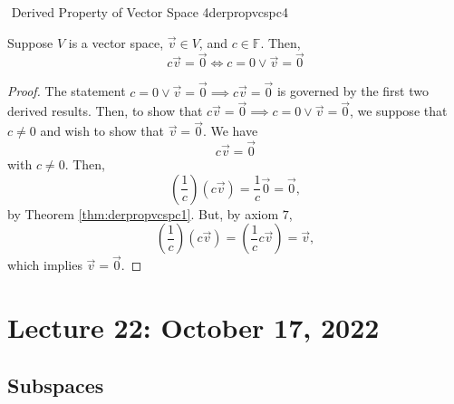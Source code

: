         \begin{theorem}{\Stop\,\,Derived Property of Vector Space 4}{derpropvcspc4}

            Suppose \(V\) is a vector space, \(\vec{v}\in V\), and \(c\in\mathbb{F}\). Then,
            \begin{equation*}
                c\vec{v}=\vec{0}\iff c=0\vee \vec{v}=\vec{0}
            \end{equation*}
            \begin{proof}
                The statement \(c=0\vee\vec{v}=\vec{0}\implies c\vec{v}=\vec{0}\) is governed by the first two derived results. Then, to show that \(c\vec{v}=\vec{0}\implies c=0\vee\vec{v}=\vec{0}\), we suppose that \(c\neq0\) and wish to show that \(\vec{v}=\vec{0}\). We have
                \begin{equation*}
                    c\vec{v}=\vec{0}
                \end{equation*}
                with \(c\neq0\). Then,
                \begin{equation*}
                    \left(\frac{1}{c}\right)(c\vec{v})=\frac{1}{c}\vec{0}=\vec{0},
                \end{equation*}
                by Theorem \ref{thm:derpropvcspc1}. But, by axiom \(7\), 
                \begin{equation*}
                    \left(\frac{1}{c}\right)(c\vec{v})=\left(\frac{1}{c}c\vec{v}\right)=\vec{v},
                \end{equation*}
                which implies \(\vec{v}=\vec{0}\).
            \end{proof}
        \end{theorem}

\pagebreak

\section{Lecture 22: October 17, 2022}

    \subsection{Subspaces}

